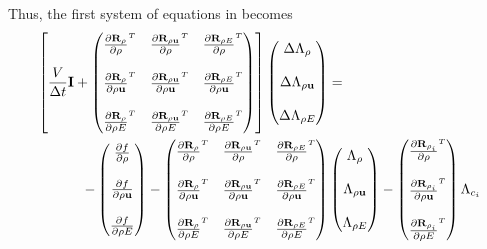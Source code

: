 Thus, the first system of equations in  becomes
\begin{equation}
  \begin{split}
    \left[
      \frac{V}{\Delta t} \mi +
      \begin{pmatrix}
        \rtdiff{\rho}{\rho} & \rtdiff{\rho \vu}{\rho} & \rtdiff{\rho E}{\rho} \\ \\
        \rtdiff{\rho}{\rho \vu} & \rtdiff{\rho \vu}{\rho \vu} & \rtdiff{\rho E}{\rho \vu} \\ \\
        \rtdiff{\rho}{\rho E} & \rtdiff{\rho \vu}{\rho E} & \rtdiff{\rho E}{\rho E}
      \end{pmatrix}
    \right]
    \begin{pmatrix}
      \Delta \adjlam{\rho} \\ \\
      \Delta \adjlam{\rho \vu} \\ \\
      \Delta \adjlam{\rho E}
    \end{pmatrix}
    &= \\ -
    \begin{pmatrix}
      \pd{f}{\rho} \\ \\
      \pd{f}{\rho \vu} \\ \\
      \pd{f}{\rho E}
    \end{pmatrix}
    -
    \begin{pmatrix}
      \rtdiff{\rho}{\rho} & \rtdiff{\rho \vu}{\rho} & \rtdiff{\rho E}{\rho} \\ \\
      \rtdiff{\rho}{\rho \vu} & \rtdiff{\rho \vu}{\rho \vu} & \rtdiff{\rho E}{\rho \vu} \\ \\
      \rtdiff{\rho}{\rho E} & \rtdiff{\rho \vu}{\rho E} & \rtdiff{\rho E}{\rho E}
    \end{pmatrix}
    &
    \begin{pmatrix}
      \adjlam{\rho} \\ \\
      \adjlam{\rho \vu} \\ \\
      \adjlam{\rho E}
    \end{pmatrix}
    -
    \begin{pmatrix}
      \rtdiff{\rho_i}{\rho} \\ \\
      \rtdiff{\rho_i}{\rho \vu} \\ \\
      \rtdiff{\rho_i}{\rho E}
    \end{pmatrix}
    \adjlam{c_i}
  \end{split}
  \label{adj-dc-time1}
\end{equation}
